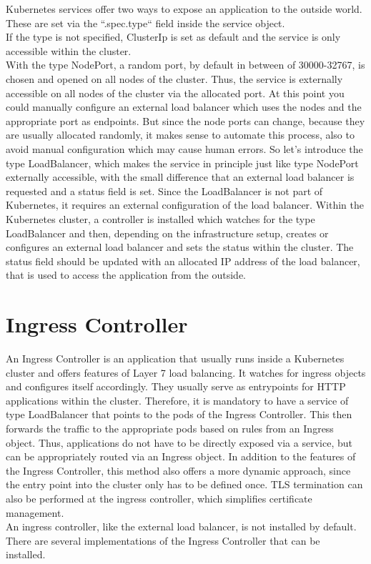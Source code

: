 Kubernetes services offer two ways to expose an application to the outside world.
These are set via the ``.spec.type`` field inside the service object.
\\
If the type is not specified, ClusterIp is set as default and the service is only accessible within the cluster.
\\
With the type NodePort, a random port, by default in between of 30000-32767, is chosen and opened on all nodes of the cluster.
Thus, the service is externally accessible on all nodes of the cluster via the allocated port.
At this point you could manually configure an external load balancer which uses the nodes and the appropriate port as endpoints.
But since the node ports can change, because they are usually allocated randomly, it makes sense to automate this process, also to avoid manual configuration which may cause human errors.
So let's introduce the type LoadBalancer, which makes the service in principle just like type NodePort externally accessible, with the small difference that an external load balancer is requested and a status field is set.
Since the LoadBalancer is not part of Kubernetes, it requires an external configuration of the load balancer.
Within the Kubernetes cluster, a controller is installed which watches for the type LoadBalancer and then, depending on the infrastructure setup, creates or configures an external load balancer and sets the status within the cluster.
The status field should be updated with an allocated IP address of the load balancer, that is used to access the application from the outside.~\cite{KUBERNETES-SERVICE}

\section{Ingress Controller}\label{sec:IngressController}

An Ingress Controller is an application that usually runs inside a Kubernetes cluster and offers features of Layer 7 load balancing.
It watches for ingress objects and configures itself accordingly.
They usually serve as entrypoints for HTTP applications within the cluster.
Therefore, it is mandatory to have a service of type LoadBalancer that points to the pods of the Ingress Controller.
This then forwards the traffic to the appropriate pods based on rules from an Ingress object.
Thus, applications do not have to be directly exposed via a service, but can be appropriately routed via an Ingress object.
In addition to the features of the Ingress Controller, this method also offers a more dynamic approach, since the entry point into the cluster only has to be defined once.
TLS termination can also be performed at the ingress controller, which simplifies certificate management.~\cite{KUBERNETES-INGRESS}
\\
An ingress controller, like the external load balancer, is not installed by default.
There are several implementations of the Ingress Controller that can be installed.~\cite{KUBERNETES-INGRESS-CONTROLLER}

